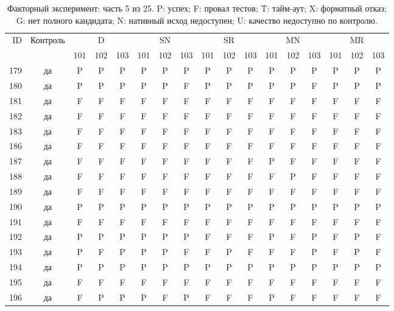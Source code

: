 \begin{table}[p]\centering\footnotesize
\setlength{\tabcolsep}{3pt}
\caption{Факторный эксперимент: часть 5 из 25. P: успех; F: провал тестов; T: тайм-аут; X: форматный отказ; G: нет полного кандидата; N: нативный исход недоступен; U: качество недоступно по контролю.}
\begin{tabular*}{\textwidth}{@{\extracolsep{\fill}}rcccccccccccccccc}\toprule
ID & Контроль & \multicolumn{3}{c}{D} & \multicolumn{3}{c}{SN} & \multicolumn{3}{c}{SR} & \multicolumn{3}{c}{MN} & \multicolumn{3}{c}{MR}\\
\cmidrule(lr){3-5}\cmidrule(lr){6-8}\cmidrule(lr){9-11}\cmidrule(lr){12-14}\cmidrule(lr){15-17}
 & & 101 & 102 & 103 & 101 & 102 & 103 & 101 & 102 & 103 & 101 & 102 & 103 & 101 & 102 & 103\\\midrule
179 & да & P & P & P & P & P & P & P & P & P & P & P & P & P & P & P\\
180 & да & P & P & P & P & P & F & P & P & P & P & P & F & P & P & P\\
181 & да & F & F & F & F & F & F & F & F & F & F & F & F & F & F & F\\
182 & да & F & F & F & F & F & F & F & F & F & F & F & F & F & F & F\\
183 & да & F & F & F & F & F & F & F & F & F & F & F & F & F & F & F\\
186 & да & F & F & F & F & F & F & F & F & F & F & F & F & F & F & F\\
187 & да & F & F & F & F & F & F & F & F & F & P & F & F & F & F & F\\
188 & да & F & F & F & F & F & F & F & F & F & F & P & F & F & F & F\\
189 & да & F & F & F & F & F & F & F & F & F & F & F & F & F & F & F\\
190 & да & P & P & P & P & P & P & P & P & P & P & P & P & P & P & P\\
191 & да & F & F & F & F & F & F & F & F & F & F & F & F & F & F & F\\
192 & да & P & P & P & P & P & P & F & F & F & P & F & P & F & P & F\\
193 & да & P & F & P & P & P & F & F & P & F & F & F & P & F & P & F\\
194 & да & P & P & P & P & P & P & P & P & P & P & P & P & P & P & P\\
195 & да & F & F & F & F & F & F & F & F & F & F & F & F & F & F & F\\
196 & да & F & P & P & P & F & P & F & F & F & P & F & F & F & F & F\\

\end{tabular*}
\end{table}
